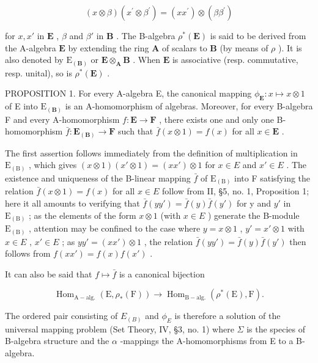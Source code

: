 \[
(x \otimes \beta) (x ^ {\prime} \otimes \beta^ {\prime}) = (x x ^ {\prime}) \otimes (\beta \beta^ {\prime})\tag{5}
\]

for \(x, x'\) in \(\mathbf{E}\) , \(\beta\) and \(\beta'\) in \(\mathbf{B}\) . The B-algebra \(\rho^*(\mathbf{E})\) is said to be derived from the A-algebra \(\mathbf{E}\) by extending the ring \(\mathbf{A}\) of scalars to \(\mathbf{B}\) (by means of \(\rho\) ). It is also denoted by \(\mathrm{E}_{(\mathbf{B})}\) or \(\mathbf{E} \otimes_{\mathbf{A}} \mathbf{B}\) . When \(\mathbf{E}\) is associative (resp. commutative, resp. unital), so is \(\rho^*(\mathbf{E})\) .

PROPOSITION 1. For every A-algebra E, the canonical mapping \(\phi_{\mathbf{E}}: x \mapsto x \otimes 1\) of E into \(\mathrm{E}_{(\mathbf{B})}\) is an A-homomorphism of algebras. Moreover, for every B-algebra F and every A-homomorphism \(f: \mathbf{E} \to \mathbf{F}\) , there exists one and only one B-homomorphism \(\bar{f}: \mathbf{E}_{(\mathbf{B})} \to \mathbf{F}\) such that \(\bar{f}(x \otimes 1) = f(x)\) for all \(x \in \mathbf{E}\) .

The first assertion follows immediately from the definition of multiplication in \(\mathrm{E}_{(\mathrm{B})}\) , which gives \((x\otimes1)(x'\otimes1)=(xx')\otimes1\) for \(x\in E\) and \(x'\in E\) . The existence and uniqueness of the B-linear mapping \(\bar{f}\) of \(\mathrm{E}_{(\mathrm{B})}\) into F satisfying the relation \(\bar{f}(x\otimes1)=f(x)\) for all \(x\in E\) follow from II, §5, no. 1, Proposition 1; here it all amounts to verifying that \(\bar{f}(yy')=\bar{f}(y)\bar{f}(y')\) for y and \(y'\) in \(\mathrm{E}_{(\mathrm{B})}\) ; as the elements of the form \(x\otimes1\) (with \(x\in E\) ) generate the B-module \(\mathrm{E}_{(\mathrm{B})}\) , attention may be confined to the case where \(y=x\otimes1\) , \(y'=x'\otimes1\) with \(x\in E\) , \(x'\in E\) ; as \(yy'=(xx')\otimes1\) , the relation \(\bar{f}(yy')=\bar{f}(y)\bar{f}(y')\) then follows from \(f(xx')=f(x)f(x')\) .

It can also be said that \(f \mapsto \bar{f}\) is a canonical bijection

\[
\operatorname{Hom} _ {\mathrm{A-alg.}} (\mathrm{E}, \rho_ {*} (\mathrm{F})) \rightarrow \operatorname{Hom} _ {\mathrm{B-alg.}} (\rho^ {*} (\mathrm{E}), \mathrm{F}).\tag{6}
\]

The ordered pair consisting of \(E_{(B)}\) and \(\phi_{E}\) is therefore a solution of the universal mapping problem (Set Theory, IV, §3, no. 1) where \(\Sigma\) is the species of B-algebra structure and the \(\alpha\) -mappings the A-homomorphisms from E to a B-algebra.

